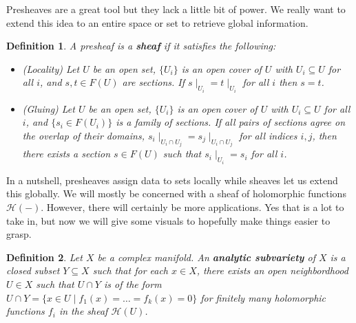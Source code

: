 \documentclass[12pt, letterpaper]{article}
\newtheorem{definition}{Definition}[section]
\newcommand{\ten}[1]{\textnormal{\textbf{#1}}}
\begin{document}
Presheaves are a great tool but they lack a little bit of power. We really want 
to extend this idea to an entire space or set to retrieve global information.

\begin{definition}
    A presheaf is a \ten{sheaf} if it satisfies the following:
    \begin{itemize}
        \item (Locality) Let $U$ be an open set, $\{U_i\}$ is an open cover of $U$
        with $U_i \subseteq U$ for all $i$, and $s,t \in F(U)$ are sections. If
        $s\mid_{U_i} = t \mid_{U_i}$ for all $i$ then $s=t$.
        \item (Gluing) Let $U$ be an open set, $\{U_i\}$ is an open cover of $U$
        with $U_i \subseteq U$ for all $i$, and $\{s_i \in F(U_i)\}$ is a family
        of sections. If all pairs of sections agree on the overlap of their domains,
        $s_i\mid_{U_i\cap U_j} = s_j\mid_{U_i\cap U_j}$ for all indices $i,j$, then
        there exists a section $s\in F(U)$ such that $s_i\mid_{U_i} = s_i$ for all $i$.
    \end{itemize}
\end{definition}

In a nutshell, presheaves assign data to sets locally while sheaves let us extend
this globally. We will mostly be concerned with a sheaf of holomorphic functions
$\mathcal{H}(-)$. However, there will certainly be more applications. Yes that is
a lot to take in, but now we will give some visuals to hopefully make things
easier to grasp.

\begin{definition}
    Let $X$ be a complex manifold. An \ten{analytic subvariety} of $X$ is a closed
    subset $Y \subseteq X$ such that for each $x \in X$, there exists an open neighbordhood
    $U \in X$ such that $U \cap Y$ is of the form 
    $U \cap Y = \{ x \in U \mid f_1(x) = \hdots = f_k(x) = 0\}$ for finitely many
    holomorphic functions $f_i$ in the sheaf $\mathcal{H}(U)$.
\end{definition}
\end{document}

